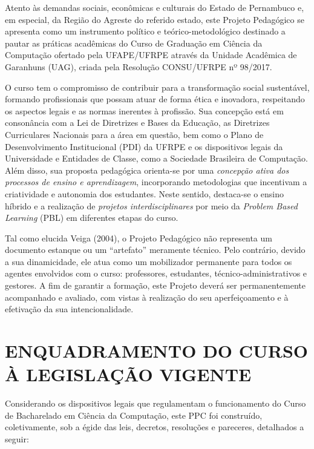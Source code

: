 \documentclass[
	12pt,				%
	openright,			%
  oneside,     %
	a4paper,			%
	english,			%
	french,				%
	spanish,			%
	brazil				%
	]{abntex2}
\begin{document}
Atento às demandas sociais, econômicas e culturais do Estado de Pernambuco e, em especial, da Região do Agreste do referido estado, este Projeto Pedagógico se apresenta como um instrumento político e teórico-metodológico destinado a pautar as práticas acadêmicas do Curso de Graduação em Ciência da Computação ofertado pela UFAPE/UFRPE através da Unidade Acadêmica de Garanhuns (UAG), criada pela Resolução CONSU/UFRPE nº 98/2017.

O curso tem o compromisso de contribuir para a transformação social sustentável, formando profissionais que possam atuar de forma ética e inovadora, respeitando os aspectos legais e as normas inerentes à profissão. Sua concepção está em consonância com a Lei de Diretrizes e Bases da Educação, as Diretrizes Curriculares Nacionais para a área em questão, bem como o Plano de Desenvolvimento Institucional (PDI) da UFRPE e os dispositivos legais da Universidade e Entidades de Classe, como a Sociedade Brasileira de Computação. Além disso, sua proposta pedagógica orienta-se por uma \textit{concepção ativa dos processos de ensino e aprendizagem}, incorporando metodologias que incentivam a criatividade e autonomia dos estudantes. Neste sentido, destaca-se o ensino híbrido e a realização de \textit{projetos interdisciplinares} por meio da \textit{Problem Based Learning} (PBL) em diferentes etapas do curso.

Tal como elucida Veiga (2004), o Projeto Pedagógico não representa um documento estanque ou um ``artefato'' meramente técnico. Pelo contrário, devido a sua dinamicidade, ele atua como um mobilizador permanente para todos os agentes envolvidos com o curso: professores, estudantes, técnico-administrativos e gestores. A fim de garantir a formação, este Projeto deverá ser permanentemente acompanhado e avaliado, com vistas à realização do seu aperfeiçoamento e à efetivação da sua intencionalidade.



\chapter*{ENQUADRAMENTO DO CURSO À LEGISLAÇÃO VI\-GEN\-TE}

Considerando os dispositivos legais que regulamentam o funcionamento do Curso de Bacharelado em Ciência da Computação, este PPC foi construído, coletivamente, sob a égide das leis, decretos, resoluções e pareceres, detalhados a seguir:
\end{document}
